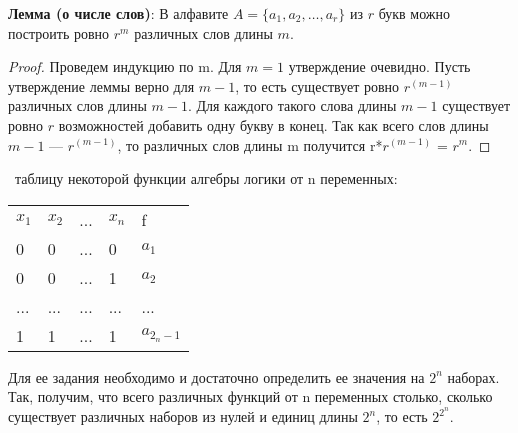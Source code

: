 \textbf{Лемма (о числе слов)}: В алфавите $A = \{a_{1}, a_{2}, \ldots, a_{r}\}$ из $r$ букв можно построить ровно $r^m$ различных слов длины $m$. \\
\begin{proof}
Проведем индукцию по m. Для $m = 1$ утверждение очевидно. Пусть утверждение леммы верно для $m - 1$, то есть существует ровно $r^{(m-1)}$ различных слов длины $m - 1$. Для каждого такого слова длины $m-1$ существует ровно $r$ возможностей добавить одну букву в конец. Так как всего слов длины $m-1$ --- $r^{(m-1)}$, то различных слов длины m получится r*$r^{(m-1)}$ = $r^m$. 
\end{proof}

\faEye \ таблицу некоторой функции алгебры логики от n переменных:

\begin{tabular}{ l l l l l }
$x_{1}$ & $x_{2}$ & ... & $x_{n}$ & f \\
0 & 0 & ... & 0 & $a_{1}$ \\
0 & 0 & ... & 1 & $a_{2}$\\
... & ... & ... & ... & ...\\
1 & 1 & ... & 1 & $a_{2_{n} - 1}$\\
\end{tabular}

Для ее задания необходимо и достаточно определить ее значения на $2^{n}$ наборах. Так, получим, что всего различных функций от n переменных столько, сколько существует различных наборов из нулей и единиц длины $2^{n}$, то есть $2^{2^{n}}$. \\

